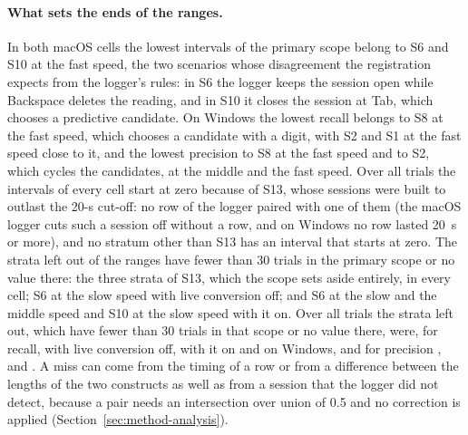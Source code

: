 \paragraph{What sets the ends of the ranges.} In both macOS cells the lowest intervals of the primary scope belong to
S6 and S10 at the fast speed, the two scenarios whose disagreement the registration expects from the logger's rules: in
S6 the logger keeps the session open while Backspace deletes the reading, and in S10 it closes the session at Tab,
which chooses a predictive candidate. On Windows the lowest recall belongs to S8 at the fast speed, which chooses a
candidate with a digit, with S2 and S1 at the fast speed close to it, and the lowest precision to S8 at the fast speed
and to S2, which cycles the candidates, at the middle and the fast speed. Over all trials the intervals of every cell
start at zero because of S13, whose sessions were built to outlast the 20-s cut-off: no row of the logger paired with
one of them (the macOS logger cuts such a session off without a row, and on Windows no row lasted 20~s or more), and
no stratum other than S13 has an interval that starts at zero. The strata left out of the ranges have fewer than 30
trials in the primary scope or no value there: the three strata of S13, which the scope sets aside entirely, in every
cell; S6 at the slow speed with live conversion off; and S6 at the slow and the middle speed and S10 at the slow speed
with it on. Over all trials the strata left out, which have fewer than 30 trials in that scope or no value there, were,
for recall,  with live conversion off,
 with it on and
 on Windows, and for precision
, 
and . A miss can come from
the timing of a row or from a difference between the lengths of the two constructs as well as from a session that the
logger did not detect, because a pair needs an intersection over union of 0.5 and no correction is applied
(Section~\ref{sec:method-analysis}).

